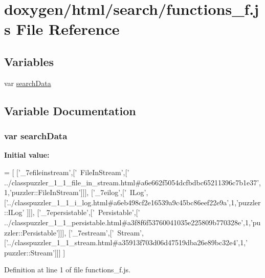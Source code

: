 \hypertarget{a00098}{}\section{doxygen/html/search/functions\+\_\+f.js File Reference}
\label{a00098}
\subsection*{Variables}
\begin{DoxyCompactItemize}
\item 
var \hyperlink{a00098_ad01a7523f103d6242ef9b0451861231e}{search\+Data}
\end{DoxyCompactItemize}


\subsection{Variable Documentation}
\hypertarget{a00098_ad01a7523f103d6242ef9b0451861231e}{}
\subsubsection[{search\+Data}]{\setlength{\rightskip}{0pt plus 5cm}var search\+Data}\label{a00098_ad01a7523f103d6242ef9b0451861231e}
{\bfseries Initial value\+:}
\begin{DoxyCode}
=
[
  [\textcolor{stringliteral}{'\_7efileinstream'},[\textcolor{stringliteral}{'~FileInStream'},[\textcolor{stringliteral}{'
      ../classpuzzler\_1\_1\_file\_in\_stream.html#a6e662f5054dcfbdbc65211396c7b1e37'},1,\textcolor{stringliteral}{'puzzler::FileInStream'}]]],
  [\textcolor{stringliteral}{'\_7eilog'},[\textcolor{stringliteral}{'~ILog'},[\textcolor{stringliteral}{'../classpuzzler\_1\_1\_i\_log.html#a6eb498cf2e16539a9c45bc86eef22e9a'},1,\textcolor{stringliteral}{'puzzler::ILog'}
      ]]],
  [\textcolor{stringliteral}{'\_7epersistable'},[\textcolor{stringliteral}{'~Persistable'},[\textcolor{stringliteral}{'
      ../classpuzzler\_1\_1\_persistable.html#a3f8f6f53760041035e225809b770328e'},1,\textcolor{stringliteral}{'puzzler::Persistable'}]]],
  [\textcolor{stringliteral}{'\_7estream'},[\textcolor{stringliteral}{'~Stream'},[\textcolor{stringliteral}{'../classpuzzler\_1\_1\_stream.html#a35913f703d06d47519dba26e89bc32e4'},1,\textcolor{stringliteral}{'
      puzzler::Stream'}]]]
]
\end{DoxyCode}


Definition at line 1 of file functions\+\_\+f.\+js.

